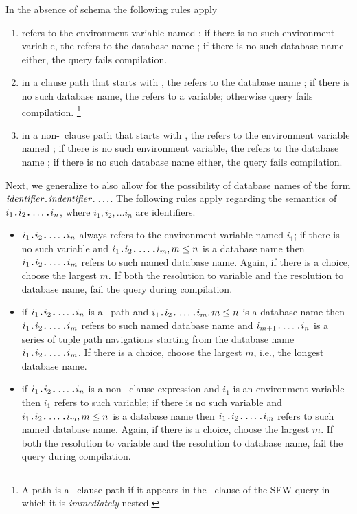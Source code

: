 In the absence of schema the following rules apply
\begin{enumerate}
\item {} refers to the environment variable named
; if there is no such environment variable, the 
refers to the database name ; if there is no such database name
either, the query fails compilation.
\item in a  clause path that starts with , the
 refers to the database name ; if there is no such
database name, the  refers to a variable; otherwise query fails
compilation. \footnote{A path is a \from\ clause path if it appears in the \from
\ clause of the SFW query in which it is \textit{immediately} nested.}
\item in a non-\from\ clause path that starts with , the
 refers to the environment variable named ; if
there is no such environment variable, the  refers to the
database name ; if there is no such database name either, the
query fails compilation.
\end{enumerate}

Next, we
generalize to also allow for the possibility of database names of the form
$\textit{identifier}\texttt{\textbf{.}}\textit{indentifier}\texttt{\textbf{.}}\ldots$. The following rules apply
regarding the semantics of $i_1 \texttt{\textbf{.}} i_2 \texttt{\textbf{.}} \ldots \texttt{\textbf{.}} i_n$, where
$i_1, i_2, \ldots i_n$ are identifiers.
\begin{itemize}
\item {}$i_1 \texttt{\textbf{.}} i_2 \texttt{\textbf{.}} \ldots \texttt{\textbf{.}} i_n$ always refers to the
environment variable named $i_1$; if there is no such variable and $i_1 \texttt{\textbf{.}}
i_2 \texttt{\textbf{.}} \ldots \texttt{\textbf{.}} i_m, m\leq n$ is a database name then $i_1 \texttt{\textbf{.}} i_2
\texttt{\textbf{.}} \ldots \texttt{\textbf{.}} i_m$ refers to such named database name. Again, if there is
a choice, choose the largest $m$. If both the resolution to variable and the
resolution to database name, fail the query during compilation.
%
\item if  $i_1 \texttt{\textbf{.}} i_2 \texttt{\textbf{.}} \ldots \texttt{\textbf{.}} i_n$ is a \from\ path and $i_1
\texttt{\textbf{.}} i_2 \texttt{\textbf{.}} \ldots \texttt{\textbf{.}} i_m, m\leq n$ is a database name then $i_1
\texttt{\textbf{.}} i_2 \texttt{\textbf{.}} \ldots \texttt{\textbf{.}} i_m$ refers to such named database name and
$i_{m+1} \texttt{\textbf{.}} \ldots \texttt{\textbf{.}} i_n$ is a series of tuple path navigations
starting from the database name $i_1 \texttt{\textbf{.}} i_2 \texttt{\textbf{.}} \ldots \texttt{\textbf{.}} i_m$. If
there is a choice, choose the largest $m$, i.e., the longest database name.
%
\item if $i_1 \texttt{\textbf{.}} i_2 \texttt{\textbf{.}} \ldots \texttt{\textbf{.}} i_n$ is a non-\from\ clause
expression and $i_1$ is an environment variable then $i_1$ refers to such
variable; if there is no such variable and $i_1 \texttt{\textbf{.}} i_2 \texttt{\textbf{.}} \ldots \texttt{\textbf{.}}
i_m, m\leq n$ is a database name then $i_1 \texttt{\textbf{.}} i_2 \texttt{\textbf{.}} \ldots \texttt{\textbf{.}} i_m$
refers to such named database name. Again, if there is a choice, choose the
largest $m$. If both the resolution to variable and the resolution to database
name, fail the query during compilation.
\end{itemize}

